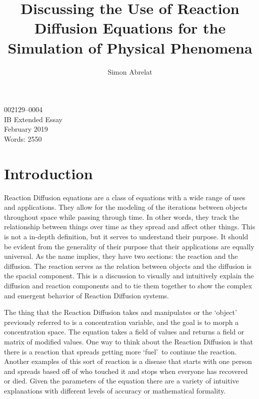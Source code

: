 \documentclass[12pt, letterpaper]{article}
\title{Discussing the Use of Reaction Diffusion Equations for the Simulation of Physical Phenomena}
\author{Simon Abrelat}
\date{\vspace{-5ex}}
\newcommand{\sorta}[1]{\lq #1\rq \,}
\begin{document}
\large
{\fontsize{12}{14.4}
  {\singlespace{}
  \maketitle
  \begin{center}
  \vspace{4mm}
  002129--0004 \\
  \vspace{4mm}
  IB Extended Essay \\
  \vspace{4mm}
  February 2019 \\
  \vspace{4mm}
  Words: 2550 \\
  \end{center}
  }
}
\newpage

\newpage
\tableofcontents
\newpage 

\section{Introduction} \label{introduction}
Reaction Diffusion equations are a class of equations with a wide range of uses and applications. They allow
for the modeling of the iterations between objects throughout space while passing through time. In other
words, they track the relationship between things over time as they spread and affect other things. This
is not a in-depth definition, but it serves to understand their purpose. It should be evident from 
the generality of their purpose that their applications are equally universal. As the name implies, they have
two sections: the reaction and the diffusion. The reaction serves as the
relation between objects and the diffusion is the spacial component. This is a discussion to visually
and intuitively explain the diffusion and reaction components and to tie them together to show the
complex and emergent behavior of Reaction Diffusion systems.


The thing that the Reaction Diffusion takes and manipulates or the \sorta{object} previously referred to is a
concentration variable, and the goal is to morph a concentration space. The equation takes a field of values and
returns a field or matrix of modified values. One way to think about the Reaction Diffusion is that there is
a reaction that spreads getting more \sorta{fuel} to continue the reaction. Another examples of this sort of reaction is a
disease that starts with one person and spreads based off of who touched it and stops when everyone has
recovered or died. Given the parameters of the equation there are a variety of intuitive explanations with
different levels of accuracy or mathematical formality. 
\end{document}

